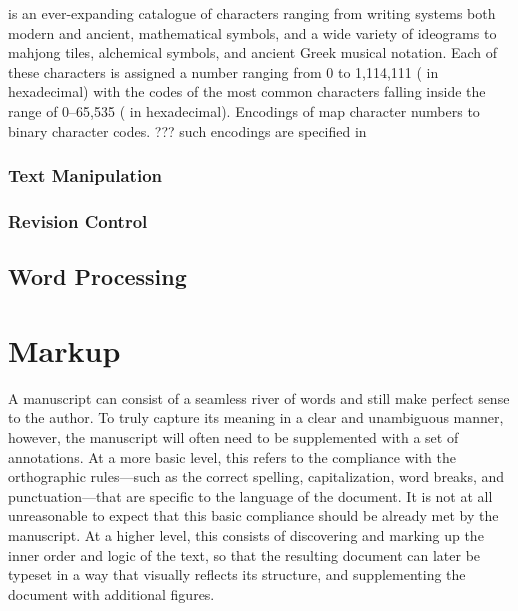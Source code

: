 \documentclass{book}
\begin{document}
 is an ever-expanding catalogue of characters ranging from writing
systems both modern and ancient, mathematical symbols, and a wide variety of
ideograms to mahjong tiles, alchemical symbols, and ancient Greek musical
notation. Each of these characters is assigned a number ranging from 0 to
1,114,111 ( in hexadecimal) with the codes of the most common
characters falling inside the range of 0--65,535 ( in hexadecimal).
Encodings of  map character numbers to binary character codes. ???
such encodings are specified in \cite{iso93}


%
%
%


\subsection{Text Manipulation}
\subsection{Revision Control}
\section{Word Processing}

\chapter{Markup}
A manuscript can consist of a seamless river of words and still make perfect
sense to the author. To truly capture its meaning in a clear and unambiguous
manner, however, the manuscript will often need to be supplemented with a set of
annotations. At a more basic level, this refers to the compliance with the
orthographic rules---such as the correct spelling, capitalization, word breaks,
and punctuation---that are specific to the language of the document.  It is not
at all unreasonable to expect that this basic compliance should be already met
by the manuscript. At a higher level, this consists of discovering and marking
up the inner order and logic of the text, so that the resulting document can
later be typeset in a way that visually reflects its structure, and
supplementing the document with additional figures.
\end{document}
